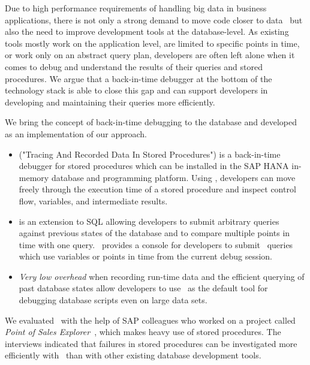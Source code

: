 Due to high performance requirements of handling big data in business applications, there is not only a strong demand to move code closer to data~\cite{plattner15:the_in-memory_revolution_how} but also the need to improve development tools at the database-level. 
As existing tools mostly work on the application level, are limited to specific points in time, or work only on an abstract query plan, developers are often left alone when it comes to debug and understand the results of their queries and stored procedures.
We argue that a back-in-time debugger at the bottom of the technology stack is able to close this gap and can support developers in developing and maintaining their queries more efficiently. 
\tmpEnd

\tmpStart

We bring the concept of back-in-time debugging to the database and developed \emph{\tool} as an implementation of our approach.

\begin{itemize}
	\item \emph{\tool} ("Tracing And Recorded Data In Stored Procedures") is a back-in-time debugger for stored procedures which can be installed in the SAP HANA in-memory database and programming platform.
		Using \tool, developers can move freely through the execution time of a stored procedure and inspect control flow, variables, and intermediate results.
	
	\item \emph{\SQLextension} is an extension to SQL allowing developers to submit arbitrary queries against previous states of the database 
		and to compare multiple points in time with one query.
		\tool\ provides a console for developers to submit \SQLextension\ queries which use variables or points in time from the current debug session.

	\item \emph{Very low overhead} when recording run-time data and the efficient querying of past database states allow developers to use \tool\ as the default tool for debugging database scripts even on large data sets.
	
\end{itemize}

We evaluated \tool\ with the help of SAP colleagues who worked on a project called \emph{Point of Sales Explorer}~\cite{plattner15:the_in-memory_revolution_how}, which makes heavy use of stored procedures. 
The interviews indicated that failures in stored procedures can be investigated more efficiently with \tool\ than with other existing database development tools.

